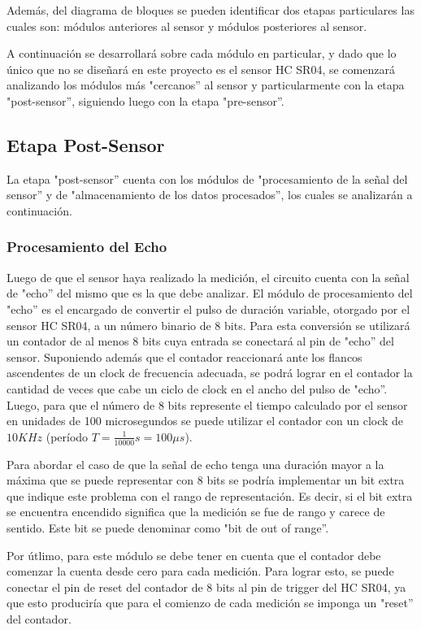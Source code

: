 Además, del diagrama de bloques se pueden identificar dos etapas particulares
las cuales son: módulos anteriores al sensor y módulos posteriores
al sensor. 

A continuación se desarrollará sobre cada módulo en particular, y
dado que lo único que no se diseñará en este proyecto es el sensor
HC SR04, se comenzará analizando los módulos más "cercanos'' al
sensor y particularmente con la etapa "post-sensor'', siguiendo
luego con la etapa "pre-sensor''.

\subsection{Etapa Post-Sensor}

La etapa "post-sensor'' cuenta con los módulos de "procesamiento
de la señal del sensor'' y de "almacenamiento de los datos procesados'',
los cuales se analizarán a continuación.

\subsubsection{Procesamiento del Echo}

Luego de que el sensor haya realizado la medición, el circuito cuenta
con la señal de "echo'' del mismo que es la que debe analizar.
El módulo de procesamiento del "echo'' es el encargado de convertir
el pulso de duración variable, otorgado por el sensor HC SR04, a un
número binario de 8 bits. Para esta conversión se utilizará un contador
de al menos 8 bits cuya entrada se conectará al pin de "echo''
del sensor. Suponiendo además que el contador reaccionará ante los
flancos ascendentes de un clock de frecuencia adecuada, se podrá lograr
en el contador la cantidad de veces que cabe un ciclo de clock en
el ancho del pulso de "echo''. Luego, para que el número de 8 bits
represente el tiempo calculado por el sensor en unidades de 100 microsegundos
se puede utilizar el contador con un clock de $10KHz$ (período $T=\frac{1}{10000}s=100\mu s$).

Para abordar el caso de que la señal de echo tenga una duración mayor
a la máxima que se puede representar con 8 bits se podría implementar
un bit extra que indique este problema con el rango de representación.
Es decir, si el bit extra se encuentra encendido significa que la
medición se fue de rango y carece de sentido. Este bit se puede denominar
como "bit de out of range''.

Por útlimo, para este módulo se debe tener en cuenta que el contador
debe comenzar la cuenta desde cero para cada medición. Para lograr
esto, se puede conectar el pin de reset del contador de 8 bits al
pin de trigger del HC SR04, ya que esto produciría que para el comienzo
de cada medición se imponga un "reset'' del contador.


